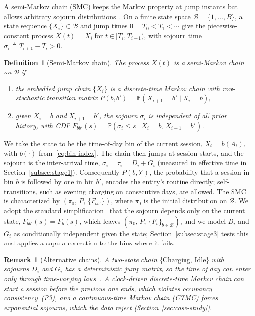 \documentclass[journal]{IEEEtran}
\newtheorem{definition}{Definition}
\newtheorem{remark}{Remark}
\begin{document}
A semi-Markov chain (SMC) keeps the Markov property at jump instants but allows arbitrary sojourn distributions~\cite{barbu2009semi}. On a finite state space $\mathcal{B} = \{1, \ldots, B\}$, a state sequence $\{X_i\} \subset \mathcal{B}$ and jump times $0 = T_0 < T_1 < \cdots$ give the piecewise-constant process $X(t) = X_i$ for $t \in [T_i, T_{i+1})$, with sojourn time $\sigma_i \triangleq T_{i+1} - T_i > 0$.

\begin{definition}[Semi-Markov chain]
\label{def:smc}
The process $X(t)$ is a \emph{semi-Markov chain} on $\mathcal{B}$ if
\begin{enumerate}
    \item the embedded jump chain $\{X_i\}$ is a discrete-time Markov chain with row-stochastic transition matrix $P(b, b') = \mathbb{P}(X_{i+1} = b' \mid X_i = b)$,
    \item given $X_i = b$ and $X_{i+1} = b'$, the sojourn $\sigma_i$ is independent of all prior history, with CDF $F_{bb'}(s) = \mathbb{P}(\sigma_i \leq s \mid X_i = b,\, X_{i+1} = b')$.
\end{enumerate}
\end{definition}

We take the state to be the time-of-day bin of the current session, $X_i = b(A_i)$, with $b(\cdot)$ from~\eqref{eq:bin-index}. The chain then jumps at session starts, and the sojourn is the inter-arrival time, $\sigma_i = \tau_i = D_i + G_i$ (measured in effective time in Section~\ref{subsec:stage1}). Consequently $P(b, b')$, the probability that a session in bin $b$ is followed by one in bin $b'$, encodes the entity's routine directly; self-transitions, such as evening charging on consecutive days, are allowed. The SMC is characterized by $(\pi_0,\, P,\, \{F_{bb'}\})$, where $\pi_0$ is the initial distribution on $\mathcal{B}$. We adopt the standard simplification~\cite{barbu2009semi} that the sojourn depends only on the current state, $F_{bb'}(s) = F_b(s)$, which leaves $(\pi_0,\, P,\, \{F_b\}_{b \in \mathcal{B}})$, and we model $D_i$ and $G_i$ as conditionally independent given the state; Section~\ref{subsec:stage3} tests this and applies a copula correction to the bins where it fails.

\begin{remark}[Alternative chains]
\label{rem:alt-chains}
A two-state chain $\{\text{Charging},\, \text{Idle}\}$ with sojourns $D_i$ and $G_i$ has a deterministic jump matrix, so the time of day can enter only through time-varying laws~\cite{iversen2016inhomogeneous,helmus2022validated}. A clock-driven discrete-time Markov chain can start a session before the previous one ends, which violates occupancy consistency~(P3), and a continuous-time Markov chain (CTMC) forces exponential sojourns, which the data reject (Section~\ref{sec:case-study}).
\end{remark}
\end{document}
